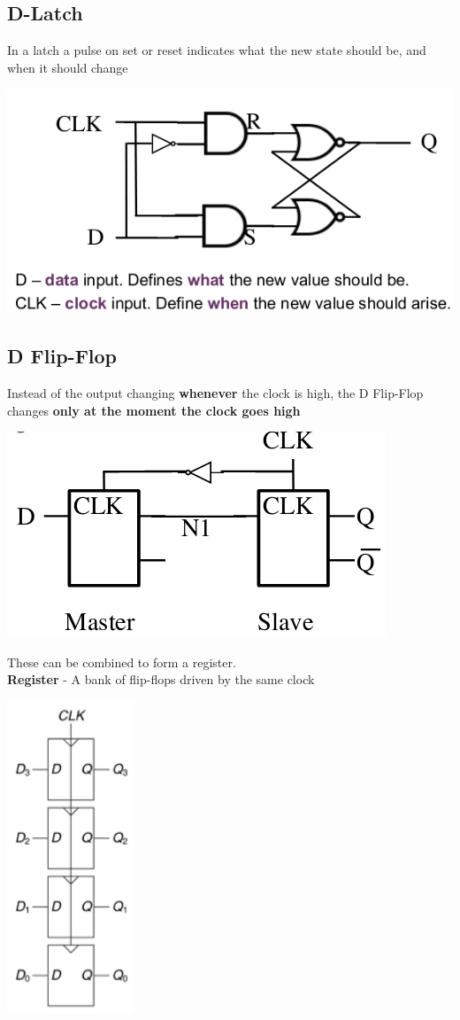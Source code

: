 \documentclass{article}[18pt]
\begin{document}
\subsection{D-Latch}
In a latch a pulse on set or reset indicates what the new state should be, and when it should change
\begin{center}
	\includegraphics[scale=0.7]{D-latch}
\end{center}
\subsection{D Flip-Flop}
Instead of the output changing \textbf{whenever} the clock is high, the D Flip-Flop changes \textbf{only at the moment the clock goes high}
\begin{center}
	\includegraphics[scale=0.7]{"D Flip-Flop"}
\end{center}
These can be combined to form a register.\\
\textbf{Register} - A bank of flip-flops driven by the same clock
\begin{center}
	\includegraphics[scale=0.7]{Register}
\end{center}
\end{document}
